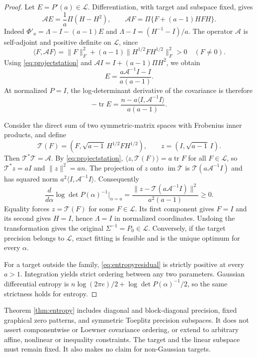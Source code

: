 \documentclass[11pt]{article}
\theoremstyle{remark}\newtheorem{remark}[theorem]{Remark}
\begin{document}
\begin{proof}
Let $E=P'(a)\in\mathcal L$. Differentiation, with target and subspace
fixed, gives
\[
 \mathcal A E=\frac1a\Pi(H-H^2),\qquad
 \mathcal A F=\Pi\{F+(a-1)HFH\}.
\]
Indeed $\Phi'_a=\Lambda-I-(a-1)E$ and
$\Lambda-I=(H^{-1}-I)/a$. The operator $\mathcal A$ is self-adjoint
and positive definite on $\mathcal L$, since
\[
 \langle F,\mathcal A F\rangle
 =\|F\|_F^2+(a-1)\|H^{1/2}FH^{1/2}\|_F^2>0
 \quad(F\ne0).
\]
Using \eqref{eq:projectstation} and
$\mathcal A I=I+(a-1)\Pi H^2$, we obtain
\[
 E=\frac{a\mathcal A^{-1}I-I}{a(a-1)}.
\]
At normalized $P=I$, the log-determinant derivative of the covariance
is therefore
\begin{equation}\label{eq:entropyderiv}
 -\operatorname{tr}E
 =\frac{n-a\langle I,\mathcal A^{-1}I\rangle}{a(a-1)}.
\end{equation}

Consider the direct sum of two symmetric-matrix spaces with Frobenius
inner products, and define
\[
 \mathcal T(F)=(F,\sqrt{a-1}\,H^{1/2}FH^{1/2}),\qquad
 z=(I,\sqrt{a-1}\,I).
\]
Then $\mathcal T^*\mathcal T=\mathcal A$. By
\eqref{eq:projectstation},
$\langle z,\mathcal T(F)\rangle=a\operatorname{tr}F$ for all
$F\in\mathcal L$, so $\mathcal T^*z=aI$ and $\|z\|^2=an$.
The projection of $z$ onto $\operatorname{im}\mathcal T$ is
$\mathcal T(a\mathcal A^{-1}I)$ and has squared norm
$a^2\langle I,\mathcal A^{-1}I\rangle$. Consequently
\begin{equation}\label{eq:entropyresidual}
 \frac{d}{d\alpha}\log\det P(\alpha)^{-1}\Big|_{\alpha=a}
 =\frac{\|z-\mathcal T(a\mathcal A^{-1}I)\|^2}{a^2(a-1)}
 \ge0.
\end{equation}
Equality forces $z=\mathcal T(F)$ for some $F\in\mathcal L$.
Its first component gives $F=I$ and its second gives $H=I$,
hence $\Lambda=I$ in normalized coordinates. Undoing the transformation
gives the original $\Sigma^{-1}=P_0\in\mathcal L$.
Conversely, if the target precision belongs to $\mathcal L$, exact
fitting is feasible and is the unique optimum for every $\alpha$.

For a target outside the family, \eqref{eq:entropyresidual} is strictly
positive at every $a>1$. Integration yields strict ordering between any
two parameters. Gaussian differential entropy is
$n\log(2\pi e)/2+\log\det P(\alpha)^{-1}/2$, so the same strictness
holds for entropy.
\end{proof}

Theorem \ref{thm:entropy} includes diagonal and block-diagonal precision,
fixed graphical zero patterns, and symmetric Toeplitz precision
subspaces. It does not assert componentwise or Loewner covariance
ordering, or extend to arbitrary affine, nonlinear or inequality
constraints. The target and the linear subspace must remain fixed.
It also makes no claim for non-Gaussian targets.
\end{document}
